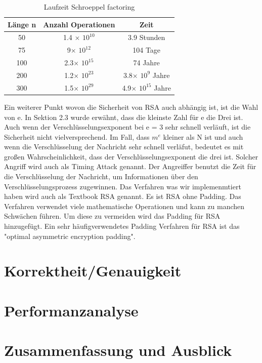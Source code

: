 \documentclass[course=asp]{aspdoc}
\begin{document}
\begin{table}[H]
\centering
   \begin{tabular}{||c c c||} 
 \hline
 Länge n & Anzahl Operationen & Zeit  \\ [0.5ex] 
 \hline\hline
 50 & 1.4 $\times$ $10^{10}$  & 3.9 Stunden  \\ 
 \hline
 75 & 9$\times $ $10^{12}$  & 104 Tage  \\
 \hline
 100 & 2.3$\times $ $10^{15}$ & 74 Jahre  \\
 \hline
 200 & 1.2$\times $ $10^{23}$ & 3.8$\times $ $10^{9}$ Jahre\\
 \hline
 300 & 1.5$\times $ $10^{29}$ & 4.9$\times $ $10^{15}$ Jahre \\ [1ex] 
 \hline

\end{tabular}
    \caption{Laufzeit Schroeppel factoring}
\end{table}
Ein weiterer Punkt wovon die Sicherheit von RSA auch abhängig ist, ist die Wahl von e. In Sektion 2.3 wurde erwähnt, dass die kleinste Zahl für e die Drei ist. Auch wenn der Verschlüsselungsexponent bei e = 3 sehr schnell verläuft, ist die Sicherheit nicht vielversprechend. Im Fall, dass $m^{e}$ kleiner als N ist und auch wenn die Verschlüsselung der Nachricht sehr schnell verläfut, bedeutet es mit großen Wahrscheinlichkeit, dass der Verschlüsselungsexponent die drei ist. Solcher Angriff wird auch als Timing Attack genannt. Der Angreiffer benutzt die Zeit für die Verschlüsselung der Nachricht, um Informationen über den Verschlüsselungsprozess zugewinnen. 
Das Verfahren was wir implemenmtiert haben wird auch als Textbook RSA genannt. Es ist RSA ohne Padding. Das Verfahren verwendet viele mathematische Operationen und kann zu manchen Schwächen führen. Um diese zu vermeiden wird das Padding für RSA hinzugefügt.  Ein sehr häufigverwendetes Padding Verfahren für RSA ist das "optimal asymmetric encryption padding". 




\section{Korrektheit/Genauigkeit}


\section{Performanzanalyse}


\section{Zusammenfassung und Ausblick}


{}
\end{document}
